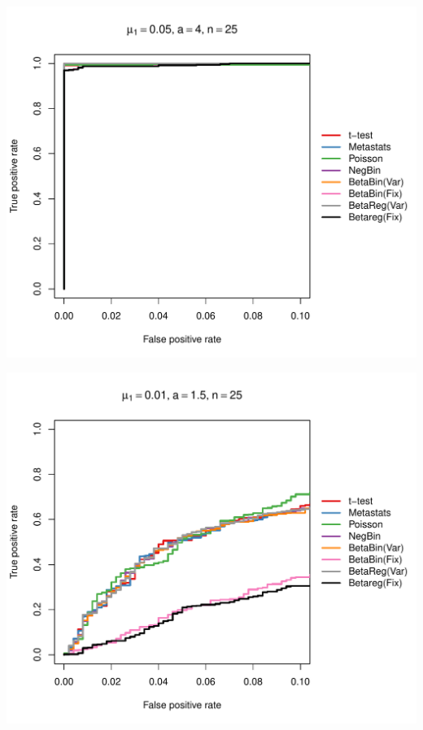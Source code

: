 \documentclass[12pt]{article}\usepackage{graphicx, color}
\makeatletter
\def\maxwidth{ %
  \ifdim\Gin@nat@width>\linewidth
    \linewidth
  \else
    \Gin@nat@width
  \fi
}
\newenvironment{knitrout}{}{} %
\makeatother
\begin{document}
\begin{knitrout}
{\centering \includegraphics[width=\maxwidth]{figure/rocs69} 

}




{\centering \includegraphics[width=\maxwidth]{figure/rocs70} 

}





\end{knitrout}
\end{document}
